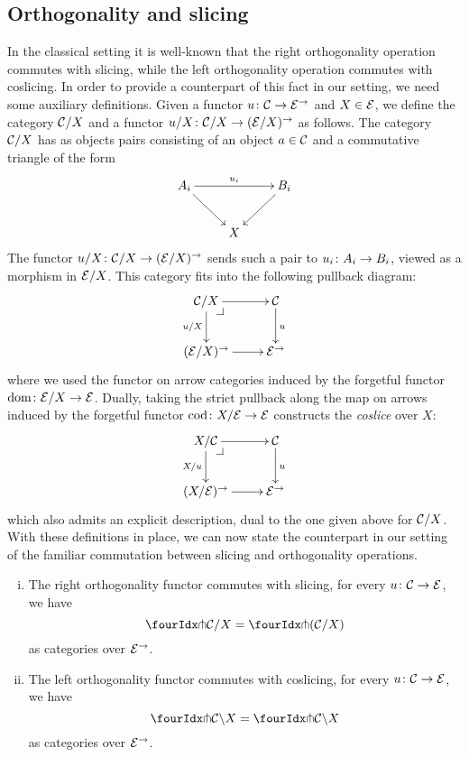 \documentclass[reqno,10pt,a4paper,oneside]{amsart}
\begin{document}
\subsection*{Orthogonality and slicing} In the classical setting it is well-known that the right orthogonality operation commutes with slicing, while the left orthogonality operation commutes with coslicing.  In order to provide a counterpart of this fact in our setting, we need some auxiliary definitions. Given a functor $u \co \cal{C} \to \catE^{\to}$ and $X \in \catE$, we define the category $\cal{C}/X$
and a functor $u/X \co \cal{C}/X \to (\cal{E}/X)^\to$ as follows. The category $\cal{C}/X$ has as objects pairs consisting of an object $a \in \cal{C}$ and a commutative triangle of the form
\[
\xymatrix{
A_i \ar[dr] \ar[rr]^{u_i} & & B_i \ar[dl] \\
 & X }
 \]
The functor $u/X \co \cal{C}/X \to (\cal{E}/X)^\to$ sends such a pair to $u_i \co A_i \to B_i$, viewed as a morphism in $\cal{E}/X$. This category fits into the
following pullback diagram:
\[
\xymatrix{
  \cal{C}/X
  \ar[r]
  \ar[d]_{u/X}
  \pullback{dr}
&
  \cal{C}
  \ar[d]^{u}
\\
  (\catE/X)^{\to}
  \ar[r]
&
  \catE^{\to}
}
\]
where we used the functor on arrow categories induced by the forgetful functor $\operatorname{dom} \co \catE/X \to \catE$.  Dually, taking the strict pullback along the map on arrows induced by the forgetful functor 
$\operatorname{cod} \co X/\cal{E} \to \catE$ constructs the \emph{coslice} over $X$:
\[
\xymatrix{
  X/\cal{C}
  \ar[r]
  \ar[d]_{X/u}
  \pullback{dr}
&
  \cal{C}
  \ar[d]^{u}
\\
  (X/\catE)^{\to}
  \ar[r]
&
  \catE^{\to}
}
\]
which also admits an explicit description, dual to the one given above for $\cal{C}/X$. With these definitions in place, we can now state the counterpart in our setting of the familiar commutation between slicing and orthogonality operations. 



\begin{proposition} \hfill 
\label{pitchfork-slicing}
\begin{enumerate}[(i)]
\item The right orthogonality functor commutes with slicing, \ie for every $u \co \cal{C} \to \cal{E}$, we have
\[
  \liftr{\cal{C}}/X = \liftr{(\cal{C}/X)}
\]
as categories over $\cal{E}^\to$.
\item The left orthogonality functor commutes with coslicing, \ie for every $u \co \cal{C} \to \cal{E}$, we have
\[
 \liftl{\cal{C}} \backslash X = \liftl{\cal{C} \backslash X}
\]
as categories over $\cal{E}^\to$.
\end{enumerate}
\end{proposition}
\end{document}
